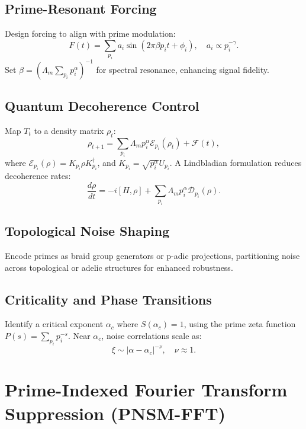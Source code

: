 \documentclass{article}
\theoremstyle{plain}
\begin{document}
\subsection{Prime-Resonant Forcing}
Design forcing to align with prime modulation:
\begin{equation}
    F(t) = \sum_{p_i} a_i \sin(2\pi \beta p_i t + \phi_i), \quad a_i \propto p_i^{-\gamma}.
\end{equation}
Set \( \beta = \left( \Lambda_m \sum_{p_i} p_i^\alpha \right)^{-1} \) for spectral resonance, enhancing signal fidelity.

\subsection{Quantum Decoherence Control}
Map \( T_t \) to a density matrix \( \rho_t \):
\begin{equation}
    \rho_{t+1} = \sum_{p_i} \Lambda_m p_i^\alpha \mathcal{E}_{p_i}(\rho_t) + \mathcal{F}(t),
\end{equation}
where \( \mathcal{E}_{p_i}(\rho) = K_{p_i} \rho K_{p_i}^\dagger \), and \( K_{p_i} = \sqrt{p_i^\alpha} U_{p_i} \). A Lindbladian formulation reduces decoherence rates:
\begin{equation}
    \frac{d\rho}{dt} = -i [H, \rho] + \sum_{p_i} \Lambda_m p_i^\alpha \mathcal{D}_{p_i}(\rho).
\end{equation}

\subsection{Topological Noise Shaping}
Encode primes as braid group generators or p-adic projections, partitioning noise across topological or adelic structures for enhanced robustness.

\subsection{Criticality and Phase Transitions}
Identify a critical exponent \( \alpha_c \) where \( S(\alpha_c) = 1 \), using the prime zeta function \( P(s) = \sum_{p_i} p_i^{-s} \). Near \( \alpha_c \), noise correlations scale as:
\begin{equation}
    \xi \sim |\alpha - \alpha_c|^{-\nu}, \quad \nu \approx 1.
\end{equation}



\section{Prime-Indexed Fourier Transform Suppression (PNSM-FFT)}
\end{document}
